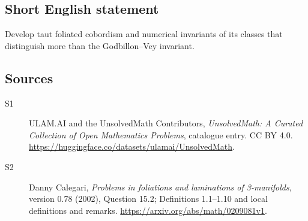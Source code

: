 \documentclass[11pt]{article}
\begin{document}
\subsection{Short English statement}
Develop taut foliated cobordism and numerical invariants of its classes that distinguish more than the Godbillon--Vey invariant.
\subsection{Sources}
\begin{description}
\item[\hypertarget{source:statement:1}{S1}] ULAM.AI and the UnsolvedMath Contributors, \emph{UnsolvedMath: A Curated Collection of Open Mathematics Problems}, catalogue entry. CC BY 4.0. \url{https://huggingface.co/datasets/ulamai/UnsolvedMath}.
\item[\hypertarget{source:statement:2}{S2}] Danny Calegari, \emph{Problems in foliations and laminations of 3-manifolds}, version 0.78 (2002), Question 15.2; Definitions 1.1--1.10 and local definitions and remarks. \url{https://arxiv.org/abs/math/0209081v1}.
\end{description}
\label{end:statement}
\end{document}
